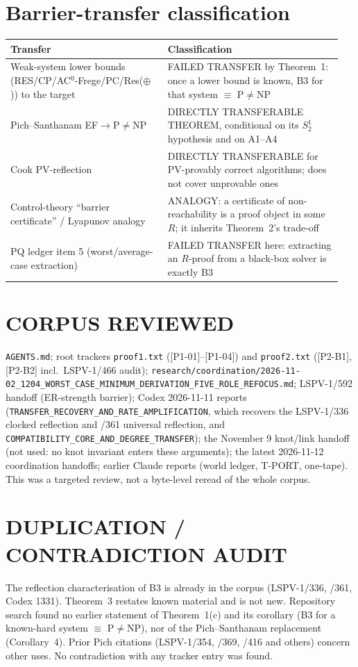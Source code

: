 \documentclass[11pt]{article}
\newcommand{\Bthree}{\mathrm{B3}}
\begin{document}
\section*{Barrier-transfer classification}
\begin{tabular}{@{}p{0.45\linewidth}p{0.5\linewidth}@{}}
\toprule
Transfer & Classification\\\midrule
Weak-system lower bounds (RES/CP/AC$^0$-Frege/PC/Res($\oplus$)) to the
target & FAILED TRANSFER by Theorem~1: once a lower bound is known, B3 for
that system $\equiv$ P$\neq$NP\\
Pich--Santhanam EF$\to$P$\neq$NP & DIRECTLY TRANSFERABLE THEOREM, conditional
on its $S^1_2$ hypothesis and on A1--A4\\
Cook PV-reflection & DIRECTLY TRANSFERABLE for PV-provably correct
algorithms; does not cover unprovable ones\\
Control-theory ``barrier certificate'' / Lyapunov analogy & ANALOGY: a
certificate of non-reachability is a proof object in some $R$; it inherits
Theorem~2's trade-off\\
PQ ledger item 5 (worst/average-case extraction) & FAILED TRANSFER here:
extracting an $R$-proof from a black-box solver is exactly $\Bthree$\\
\bottomrule
\end{tabular}

\section*{CORPUS REVIEWED}
\texttt{AGENTS.md}; root trackers \texttt{proof1.txt} ([P1-01]--[P1-04]) and
\texttt{proof2.txt} ([P2-B1], [P2-B2] incl.\ LSPV-1/466 audit);
\texttt{research/coordination/2026-11-02\_1204\_WORST\_CASE\_MINIMUM\_DERIVATION\_FIVE\_ROLE\_REFOCUS.md};
LSPV-1/592 handoff (ER-strength barrier); Codex 2026-11-11 reports
(\texttt{TRANSFER\_RECOVERY\_AND\_RATE\_AMPLIFICATION}, which recovers the
LSPV-1/336 clocked reflection and /361 universal reflection, and
\texttt{COMPATIBILITY\_CORE\_AND\_DEGREE\_TRANSFER}); the November 9
knot/link handoff (not used: no knot invariant enters these arguments); the
latest 2026-11-12 coordination handoffs; earlier Claude reports
(world ledger, T-PORT, one-tape). This was a targeted review, not a
byte-level reread of the whole corpus.

\section*{DUPLICATION / CONTRADICTION AUDIT}
The reflection characterisation of B3 is already in the corpus (LSPV-1/336,
/361, Codex 1331). Theorem~3 restates known material and is not new.
Repository search found no earlier statement of Theorem~1(c) and its
corollary (B3 for a known-hard system $\equiv$ P$\neq$NP), nor of the
Pich--Santhanam replacement (Corollary~4). Prior Pich citations (LSPV-1/354,
/369, /416 and others) concern other uses. No contradiction with any
tracker entry was found.
\end{document}
